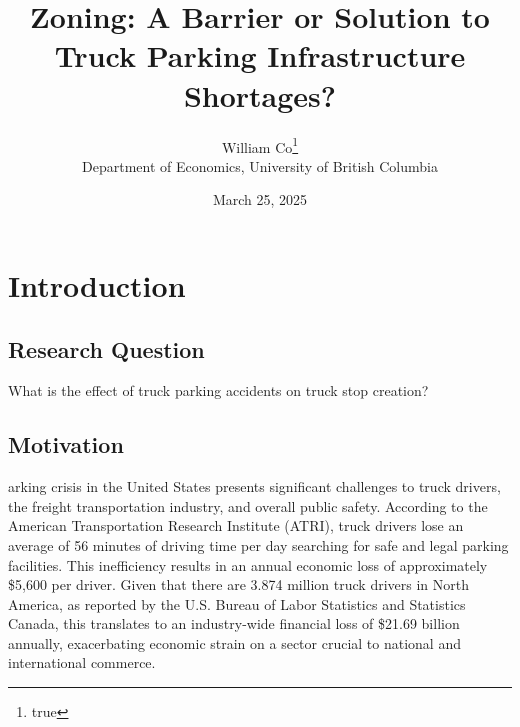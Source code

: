 \documentclass[
  12pt]{article}
\begin{document}
\def\spacingset#1{\renewcommand{\baselinestretch}%
{#1}\small\normalsize} \spacingset{1}



\date{March 25, 2025}
\title{\bf Zoning: A Barrier or Solution to Truck Parking Infrastructure
Shortages?}
\author{
William Co\thanks{true}\\
Department of Economics, University of British Columbia\\
}
\maketitle

\bigskip
\bigskip
\begin{abstract}

\end{abstract}


\newpage
\spacingset{1.9} %

\section{Introduction}\label{introduction}

\subsection{Research Question}\label{research-question}

What is the effect of truck parking accidents on truck stop creation?

\subsection{Motivation}\label{motivation}

arking crisis in the United States presents significant challenges to
truck drivers, the freight transportation industry, and overall public
safety. According to the American Transportation Research Institute
(ATRI), truck drivers lose an average of 56 minutes of driving time per
day searching for safe and legal parking facilities. This inefficiency
results in an annual economic loss of approximately \$5,600 per driver.
Given that there are 3.874 million truck drivers in North America, as
reported by the U.S. Bureau of Labor Statistics and Statistics Canada,
this translates to an industry-wide financial loss of \$21.69 billion
annually, exacerbating economic strain on a sector crucial to national
and international commerce.
\end{document}
